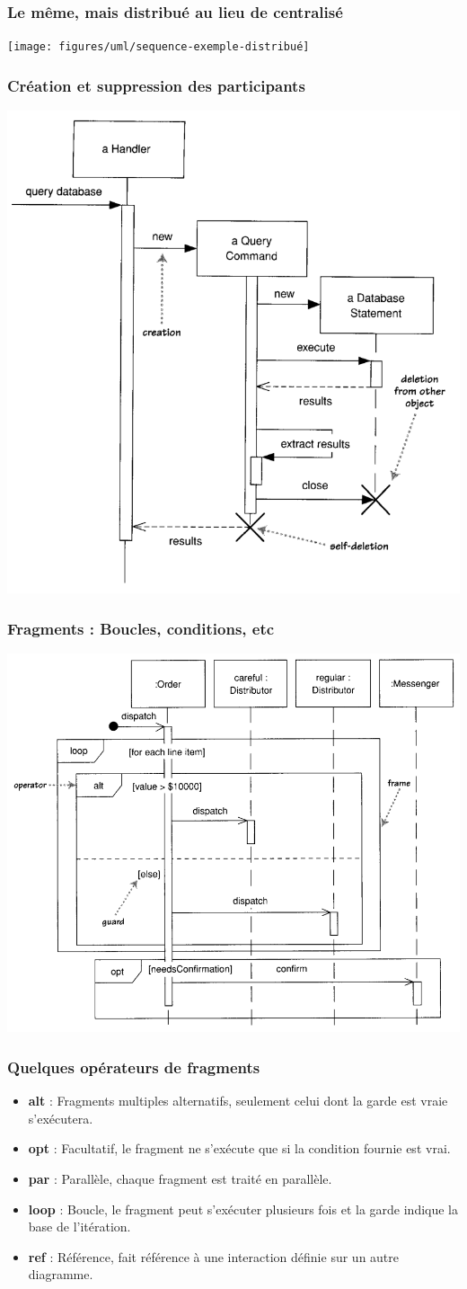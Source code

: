 \begin{frame}
    \frametitle{Le même, mais distribué au lieu de centralisé}
    \centering
    \texttt{[image: figures/uml/sequence-exemple-distribué]}
\end{frame}

\begin{frame}
    \frametitle{Création et suppression des participants}
    \centering
    \includegraphics[height=0.5\linewidth]{figures/uml/sequence-creation-deletion}
\end{frame}

\begin{frame}
    \frametitle{Fragments : Boucles, conditions, etc}
    \centering
    \includegraphics[height=0.5\linewidth]{figures/uml/sequence-fragments}
\end{frame}

\begin{frame}
    \frametitle{Quelques opérateurs de fragments}
    \begin{itemize}
        \item \textbf{alt} : Fragments multiples alternatifs, seulement celui dont la garde est vraie s'exécutera.
        \item \textbf{opt} : Facultatif, le fragment ne s'exécute que si la condition fournie est vrai.
        \item \textbf{par} : Parallèle, chaque fragment est traité en parallèle.
        \item \textbf{loop} : Boucle, le fragment peut s'exécuter plusieurs fois et la garde indique la base de l'itération.
        \item \textbf{ref} : Référence, fait référence à une interaction définie sur un autre diagramme.
    \end{itemize}
\end{frame}

